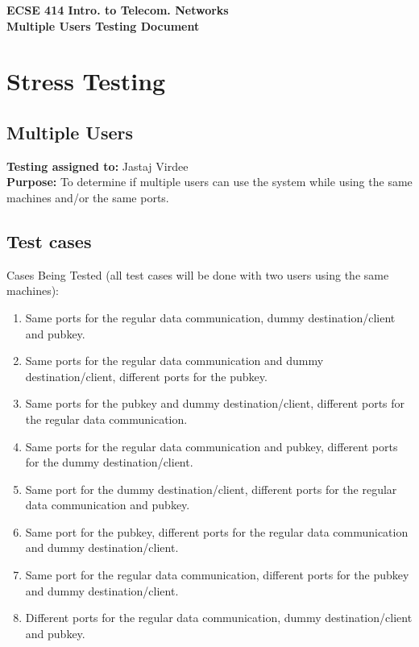 \documentclass{article}
\begin{document}
\noindent
\large \textbf{ECSE 414 Intro. to Telecom. Networks}  \\
\large \textbf{Multiple Users Testing Document} 
\tableofcontents

\section{Stress Testing}

\subsection{Multiple Users}
\textbf{Testing assigned to:} Jastaj Virdee \\
\textbf{Purpose:} To determine if multiple users can use the system while using the same machines and/or the same ports.

\subsection{Test cases}
Cases Being Tested (all test cases will be done with two users using the same machines):
\begin{enumerate}
    \item Same ports for the regular data communication, dummy destination/client and pubkey.
    \item Same ports for the regular data communication and dummy destination/client, different ports for the pubkey.
    \item Same ports for the pubkey and dummy destination/client, different ports for the regular data communication.
    \item Same ports for the regular data communication and pubkey, different ports for the dummy destination/client.
    \item Same port for the dummy destination/client, different ports for the regular data communication and pubkey.
    \item Same port for the pubkey, different ports for the regular data communication and dummy destination/client.
    \item Same port for the regular data communication, different ports for the pubkey and dummy destination/client.
    \item Different ports for the regular data communication, dummy destination/client and pubkey.
\end{enumerate}
\end{document}
